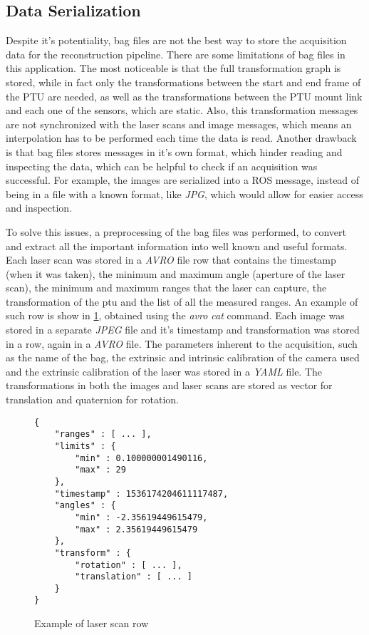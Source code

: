 \subsection{Data Serialization}
 
Despite it's potentiality, bag files are not the best way to store the acquisition data for the reconstruction pipeline. There are some limitations of bag files in this application. The most noticeable is that the full transformation graph is stored, while in fact only the transformations between the start and end frame of the PTU are needed, as well as the transformations between the PTU mount link and each one of the sensors, which are static. Also, this transformation messages are not synchronized with the laser scans and image messages, which means an interpolation has to be performed each time the data is read. Another drawback is that bag files stores messages in it's own format, which hinder reading and inspecting the data, which can be helpful to check if an acquisition was successful. For example, the images are serialized into a ROS message, instead of being in a file with a known format, like \emph{JPG}, which would allow for easier access and inspection.

To solve this issues, a preprocessing of the bag files was performed, to convert and extract all the important information into well known and useful formats. Each laser scan was stored in a \emph{AVRO} file row that contains the timestamp (when it was taken), the minimum and maximum angle (aperture of the laser scan), the minimum and maximum ranges that the laser can capture, the transformation of the ptu and the list of all the measured ranges. An example of such row is show in \cref{figure:laserscan-row}, obtained using the \emph{avro cat} command. Each image was stored in a separate \emph{JPEG} file and it's timestamp and transformation was stored in a row, again in a \emph{AVRO} file. The parameters inherent to the acquisition, such as the name of the bag, the extrinsic and intrinsic calibration of the camera used and the extrinsic calibration of the laser was stored in a \emph{YAML} file. The transformations in both the images and laser scans are stored as vector for translation and quaternion for rotation.

\begin{figure}
    
    \begin{Verbatim}[frame=single, fontsize=\small]
{
    "ranges" : [ ... ],
    "limits" : {
        "min" : 0.100000001490116,
        "max" : 29
    },
    "timestamp" : 1536174204611117487,
    "angles" : {
        "min" : -2.35619449615479,
        "max" : 2.35619449615479
    },
    "transform" : {
        "rotation" : [ ... ],
        "translation" : [ ... ]
    }
}
    \end{Verbatim}

    \caption{Example of laser scan row}
\label{figure:laserscan-row}
\end{figure}

